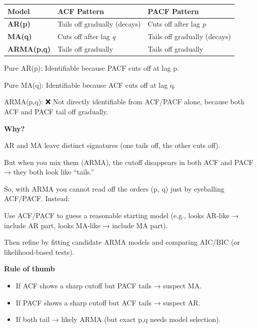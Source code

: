 \documentclass[
  11pt,
  a4paper,
]{report}
\begin{document}
\begin{longtable}[]{@{}
  >{\raggedright\arraybackslash}p{}
  >{\raggedright\arraybackslash}p{}
  >{\raggedright\arraybackslash}p{}@{}}
\toprule\noalign{}
\begin{minipage}[b]{\linewidth}\raggedright
Model
\end{minipage} & \begin{minipage}[b]{\linewidth}\raggedright
ACF Pattern
\end{minipage} & \begin{minipage}[b]{\linewidth}\raggedright
PACF Pattern
\end{minipage} \\
\midrule\noalign{}
\endhead
\bottomrule\noalign{}
\endlastfoot
\textbf{AR(p)} & Tails off gradually (decays) & Cuts off after lag
\emph{p} \\
\textbf{MA(q)} & Cuts off after lag \emph{q} & Tails off gradually
(decays) \\
\textbf{ARMA(p,q)} & Tails off gradually & Tails off gradually \\
\end{longtable}

Pure AR(p): Identifiable because PACF cuts off at lag p.

Pure MA(q): Identifiable because ACF cuts off at lag q.

ARMA(p,q): ❌ Not directly identifiable from ACF/PACF alone, because
both ACF and PACF tail off gradually.

\textbf{Why?}

AR and MA leave distinct signatures (one tails off, the other cuts off).

But when you mix them (ARMA), the cutoff disappears in both ACF and PACF
→ they both look like ``tails.''

So, with ARMA you cannot read off the orders (p, q) just by eyeballing
ACF/PACF. Instead:

Use ACF/PACF to guess a reasonable starting model (e.g., looks AR-like →
include AR part, looks MA-like → include MA part).

Then refine by fitting candidate ARMA models and comparing AIC/BIC (or
likelihood-based tests).

\textbf{Rule of thumb}

\begin{itemize}
\item
  If ACF shows a sharp cutoff but PACF tails → suspect MA.
\item
  If PACF shows a sharp cutoff but ACF tails → suspect AR.
\item
  If both tail → likely ARMA (but exact p,q needs model selection).
\end{itemize}
\end{document}
